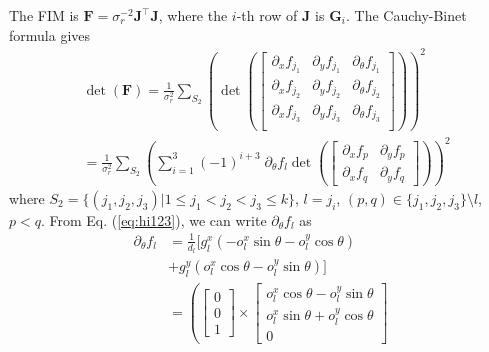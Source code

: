 \documentclass[journal]{IEEEtran}
\def\FIM{\mathbf{F}}
\begin{document}
\begin{appendices}
The FIM is $\FIM = \sigma_r^{-2} {\mathbf{J}^\top} {\mathbf{J}}$, where the $i$-th row of ${\mathbf{J}}$ is $\mathbf{G}_i$. The Cauchy-Binet formula gives
\begin{equation} \label{eq:det_F2_full}
\begin{aligned}
    &\det(\FIM) = 
    \frac{1}{\sigma_r^2} \sum\limits_{S_2}^{}
    \left(\det \left(
    \begin{bmatrix}
        \partial_x f_{j_1} & \partial_y f_{j_1} & \partial_{\theta} f_{j_1} \\
        \partial_x f_{j_2} & \partial_y f_{j_2} & \partial_{\theta} f_{j_2} \\
        \partial_x f_{j_3} & \partial_y f_{j_3} & \partial_{\theta} f_{j_3} \\
    \end{bmatrix} \right) \right)^2 \\
    &= 
    \frac{1}{\sigma_r^2} \sum\limits_{S_2}^{}
    \left(
    \sum\limits_{i=1}^{3}
    (-1)^{i+3} \; \partial_{\theta} f_l
    \det \left(
    \begin{bmatrix}
        \partial_x f_p & \partial_y f_p \\
        \partial_x f_q & \partial_y f_q 
    \end{bmatrix} \right)
    \right)^2
\end{aligned}
\end{equation}
 where 
 ${S_2 = \{ (j_1, j_2, j_3) \vert 1 \leq j_1 < j_2 < j_3 \leq k \}}$, ${l = j_i}$, ${(p,q) \in \{j_1,j_2,j_3\} \setminus l}$, $p < q$.
From Eq. (\ref{eq:hi123}), we can write $\partial_{\theta} f_l$ as
\begin{equation} \label{eq:2d_no_theta_dtfi}
\begin{aligned}
    \partial_{\theta} f_l  &= 
    \frac{1}{d_l} 
    \Big[
    g^x_l(-o^x_l \sin{\theta} - o^y_l \cos{\theta}) \\
    &+ g^y_l(o^x_l \cos{\theta} - o^y_l \sin{\theta})
    \Big]\\
    &= 
    \left(
    \begin{bmatrix}
        0 \\
        0 \\
        1
    \end{bmatrix}
    \times 
    \begin{bmatrix}
        o^x_l \cos{\theta} - o^y_l \sin{\theta} \\
        o^x_l \sin{\theta} + o^y_l \cos{\theta} \\
        0
    \end{bmatrix}

\end{aligned}
\end{equation}
\end{appendices}
\end{document}
